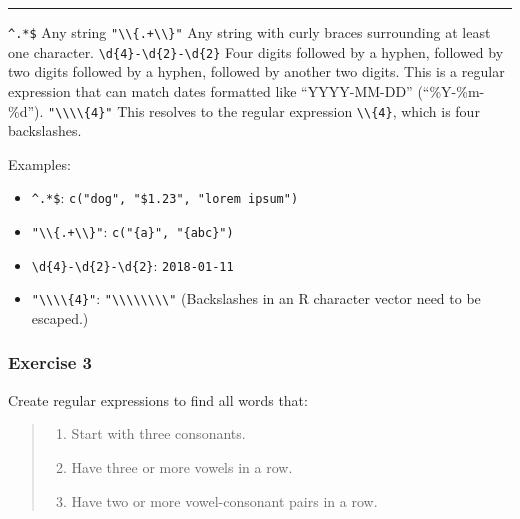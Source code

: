 \documentclass[]{book}
\providecommand{\tightlist}{%
  \setlength{\itemsep}{0pt}\setlength{\parskip}{0pt}}
\theoremstyle{definition}
\theoremstyle{definition}
\theoremstyle{definition}
\theoremstyle{remark}
\begin{document}
\begin{center}\rule{0.5\linewidth}{\linethickness}\end{center}

\texttt{\^{}.*\$} Any string
\texttt{"\textbackslash{}\textbackslash{}\{.+\textbackslash{}\textbackslash{}\}"}
Any string with curly braces surrounding at least one character.
\texttt{\textbackslash{}d\{4\}-\textbackslash{}d\{2\}-\textbackslash{}d\{2\}}
Four digits followed by a hyphen, followed by two digits followed by a
hyphen, followed by another two digits. This is a regular expression
that can match dates formatted like ``YYYY-MM-DD'' (``\%Y-\%m-\%d'').
\texttt{"\textbackslash{}\textbackslash{}\textbackslash{}\textbackslash{}\{4\}"}
This resolves to the regular expression
\texttt{\textbackslash{}\textbackslash{}\{4\}}, which is four
backslashes.

Examples:

\begin{itemize}
\tightlist
\item
  \texttt{\^{}.*\$}: \texttt{c("dog",\ "\$1.23",\ "lorem\ ipsum")}
\item
  \texttt{"\textbackslash{}\textbackslash{}\{.+\textbackslash{}\textbackslash{}\}"}:
  \texttt{c("\{a\}",\ "\{abc\}")}
\item
  \texttt{\textbackslash{}d\{4\}-\textbackslash{}d\{2\}-\textbackslash{}d\{2\}}:
  \texttt{2018-01-11}
\item
  \texttt{"\textbackslash{}\textbackslash{}\textbackslash{}\textbackslash{}\{4\}"}:
  \texttt{"\textbackslash{}\textbackslash{}\textbackslash{}\textbackslash{}\textbackslash{}\textbackslash{}\textbackslash{}\textbackslash{}"}
  (Backslashes in an R character vector need to be escaped.)
\end{itemize}

\hypertarget{exercise-3-24}{%
\subsubsection{Exercise 3}\label{exercise-3-24}}

Create regular expressions to find all words that:

\begin{quote}
\begin{enumerate}
\def\labelenumi{\arabic{enumi}.}
\tightlist
\item
  Start with three consonants.
\item
  Have three or more vowels in a row.
\item
  Have two or more vowel-consonant pairs in a row.
\end{enumerate}
\end{quote}
\end{document}

